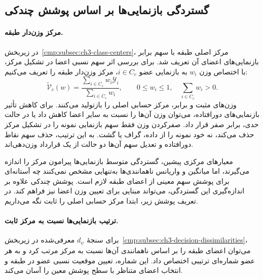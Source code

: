 \subsection{گستردگی بازنمایی‌ها بر اساس پوشش چندکی}
\label{cmp:subsec:ch3-quantile-coverage}

\paragraph{مرکز وزن‌دار طبقه.}
در زیربخش~\ref{cmp:subsec:ch3-class-centers}، مرکز
اصلی طبقه با سهم برابر بازنمایی‌های اعضای آن تعریف
شد. برای بررسی اثر سهم نسبی اعضا در تشکیل مرکز،
با اختصاص وزن $w_i$ به بازنمایی عضو $i\in C_c$،
مرکز وزن‌دار طبقه را تعریف می‌کنیم:
\begin{equation}\label{cmp:eq:ch3-outlier-weighted-center}
\widetilde{\mathcal V}_c(w)=
\frac{\sum_{i\in C_c}w_i\mathscr Y_i}
{\sum_{i\in C_c}w_i},
\qquad
0\le w_i\le1,\quad \sum_{i\in C_c}w_i>0.
\end{equation}
وزن‌های مثبت و برابر، مرکز حسابی اصلی را بازتولید
می‌کنند. برای کاهش تأثیر بازنمایی‌های دورافتاده،
می‌توان وزن آن‌ها را نسبت به سایر اعضا کاهش داد
یا در حالت حدی، برابر صفر قرار داد. صفرکردن وزن
فقط سهم بازنمایی نمونه را در تشکیل مرکز حذف می‌کند،
نه خود نمونه را از داده، گراف یا گشت. به این ترتیب،
حذف سهم نقاط دورافتاده و تعدیل سهم آن‌ها دو حالت
از یک قرارداد وزن‌دهی‌اند.

معیارهای مرکزی پیشین، گستردگی متوسط بازنمایی‌ها
پیرامون مرکز را اندازه می‌گیرند، اما میانگین و
واریانس ناهمانندی‌ها به‌تنهایی مشخص نمی‌کنند چه
آستانه‌ای برای پوشش سهم معینی از اعضای طبقه لازم
است. پوشش چندکی علاوه بر اندازه‌گیری این گستردگی،
می‌تواند مبنایی برای تعیین وزن اعضا نیز فراهم کند.
در تعریف پوشش زیر، ابتدا مرکز حسابی اصلی را ثابت
نگه می‌داریم.

\paragraph{ترتیب بازنمایی‌ها نسبت به مرکز ثابت.}
برای سنجهٔ $d_\psi$ معرفی‌شده در
زیربخش~\ref{cmp:subsec:ch3-decision-dissimilarities}،
می‌توان اعضای طبقه را بر اساس ناهمانندی آن‌ها
نسبت به مرکز مرتب کرد و به هر عضو شماره‌ای ترتیبی
اختصاص داد. این شماره، تعیین موقعیت نسبی عضو در
طبقه و انتخاب اعضای متناظر با سطح پوشش معین را
آسان می‌کند.


